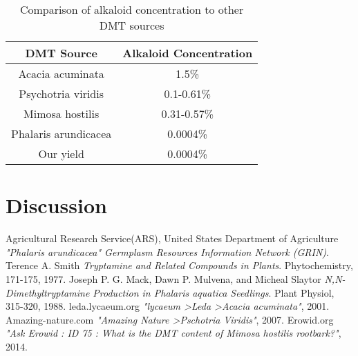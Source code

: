 \documentclass[12pt, a4paper]{article}
\begin{document}
\begin{table}[h]
\begin{center}
\begin{tabular}{|c | c|}
    \hline
    DMT Source & Alkaloid Concentration \\
    \hline
    Acacia acuminata & 1.5\% \cite{lycaeumacacia}\\ 
    Psychotria viridis & 0.1-0.61\% \cite{amazingnature}\\
    Mimosa hostilis & 0.31-0.57\% \cite{erowid}\\
    Phalaris arundicacea & 0.0004\%\\
    \hline
    Our yield & 0.0004\% \\
    \hline
\end{tabular}
\caption{Comparison of alkaloid concentration to other DMT sources}
\end{center}
\end{table}

\section{Discussion}

\begin{thebibliography}{9}
        Agricultural Research Service(ARS), United States Department of Agriculture
        \textit{"Phalaris arundicacea" Germplasm Resources Information Network (GRIN)}.
        Terence A. Smith
        \textit{Tryptamine and Related Compounds in Plants}. Phytochemistry, 171-175, 1977.
        Joseph P. G. Mack, Dawn P. Mulvena, and Micheal Slaytor
        \textit{N,N-Dimethyltryptamine Production in Phalaris aquatica Seedlings}. Plant Physiol, 315-320, 1988.
        leda.lycaeum.org
        \textit{"lycaeum \textgreater Leda \textgreater Acacia acuminata"}, 2001.
        Amazing-nature.com
        \textit{"Amazing Nature \textgreater Pschotria Viridis"}, 2007.
        Erowid.org
        \textit{"Ask Erowid : ID 75 : What is the DMT content of Mimosa hostilis rootbark?"}, 2014.
    \bibitem{}
\end{thebibliography}
\end{document}
